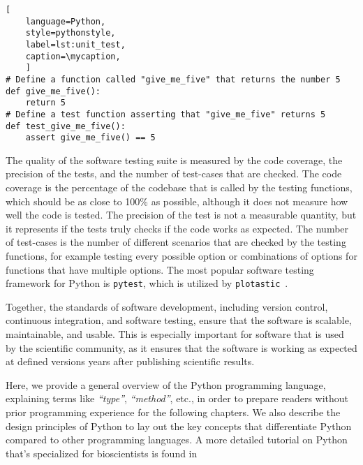 \def\mycaption{ Example of an arbitrary Python function and its respective unit
    test function. The first function simply returns the number 5. The second
    function tests if the first function indeed returns the number 5. The test
    function is named with the prefix ``\texttt{test\_}'' and is placed in a
    file that ends with the suffix ``\texttt{\_test.py}''. The test function is
    executed by the testing framework \texttt{pytest}. Note that code after
    ``\texttt{\#}'' is considered a comment and won't be executed.}
\begin{lstlisting}[
    language=Python, 
    style=pythonstyle,
    label=lst:unit_test, 
    caption=\mycaption,
    ]
# Define a function called "give_me_five" that returns the number 5
def give_me_five():
    return 5
# Define a test function asserting that "give_me_five" returns 5
def test_give_me_five():
    assert give_me_five() == 5 
\end{lstlisting}

The quality of the software testing suite is measured by the code coverage, the
precision of the tests, and the number of test-cases that are checked. The code
coverage is the percentage of the codebase that is called by the testing
functions, which should be as close to 100\% as possible, although it does not
measure how well the code is tested. The precision of the test is not a
measurable quantity, but it represents if the tests truly checks if the code
works as expected. The number of test-cases is the number of different scenarios
that are checked by the testing functions, for example testing every possible
option or combinations of options for functions that have multiple options. The
most popular software testing framework for Python is \texttt{pytest}, which is
utilized by \texttt{plotastic}~\cite{pytestx.y}.

Together, the standards of software development, including version control,
continuous integration, and software testing, ensure that the software is
scalable, maintainable, and usable. This is especially important for software
that is used by the scientific community, as it ensures that the software is
working as expected at defined versions years after publishing scientific
results.

\label{sec:python}
Here, we provide a general overview of the Python programming language,
explaining terms like \textit{``type''}, \textit{``method''}, etc., in order to
prepare readers without prior programming experience for the following chapters.
We also describe the design principles of Python to lay out the key concepts
that differentiate Python compared to other programming languages. A more
detailed tutorial on Python that's specialized for bioscientists is found
in~\citealt{ekmekciIntroductionProgrammingBioscientists2016}

